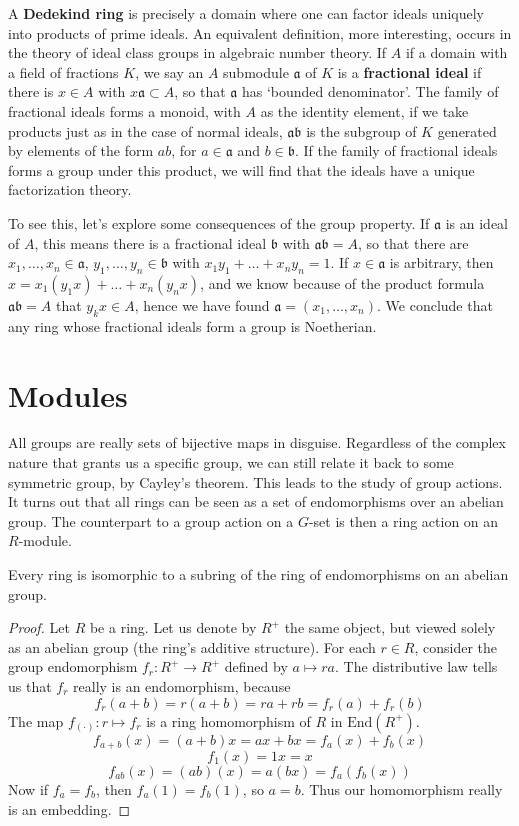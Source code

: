 A {\bf Dedekind ring} is precisely a domain where one can factor ideals uniquely into products of prime ideals. An equivalent definition, more interesting, occurs in the theory of ideal class groups in algebraic number theory. If $A$ if a domain with a field of fractions $K$, we say an $A$ submodule $\mathfrak{a}$ of $K$ is a {\bf fractional ideal} if there is $x \in A$ with $x \mathfrak{a} \subset A$, so that $\mathfrak{a}$ has `bounded denominator'. The family of fractional ideals forms a monoid, with $A$ as the identity element, if we take products just as in the case of normal ideals, $\mathfrak{ab}$ is the subgroup of $K$ generated by elements of the form $ab$, for $a \in \mathfrak{a}$ and $b \in \mathfrak{b}$. If the family of fractional ideals forms a group under this product, we will find that the ideals have a unique factorization theory.

To see this, let's explore some consequences of the group property. If $\mathfrak{a}$ is an ideal of $A$, this means there is a fractional ideal $\mathfrak{b}$ with $\mathfrak{ab} = A$, so that there are $x_1, \dots, x_n \in \mathfrak{a}$, $y_1, \dots, y_n \in \mathfrak{b}$ with $x_1y_1 + \dots + x_ny_n = 1$. If $x \in \mathfrak{a}$ is arbitrary, then $x = x_1 (y_1 x) + \dots + x_n (y_n x)$, and we know because of the product formula $\mathfrak{ab} = A$ that $y_k x \in A$, hence we have found $\mathfrak{a} = (x_1, \dots, x_n)$. We conclude that any ring whose fractional ideals form a group is Noetherian.

\chapter{Modules}

All groups are really sets of bijective maps in disguise. Regardless of the complex nature that grants us a specific group, we can still relate it back to some symmetric group, by Cayley's theorem. This leads to the study of group actions. It turns out that all rings can be seen as a set of endomorphisms over an abelian group. The counterpart to a group action on a $G$-set is then a ring action on an $R$-module.

\begin{theorem}
    Every ring is isomorphic to a subring of the ring of endomorphisms on an abelian group.
\end{theorem}
\begin{proof}
    Let $R$ be a ring. Let us denote by $R^+$ the same object, but viewed solely as an abelian group (the ring's additive structure). For each $r \in R$, consider the group endomorphism $f_r:R^+ \to R^+$ defined by $a \mapsto ra$. The distributive law tells us that $f_r$ really is an endomorphism, because
    \[ f_r(a + b) = r(a + b) = ra + rb = f_r(a) + f_r(b) \]
    The map $f_{(\cdot)}: r \mapsto f_r$ is a ring homomorphism of $R$ in $\text{End}(R^+)$.
    \[  f_{a + b}(x) = (a + b)x = ax + bx = f_a(x) + f_b(x) \]
    \[ f_{1}(x) = 1x = x \]
    \[ f_{ab}(x) = (ab)(x) = a(bx) = f_a(f_b(x)) \]
    Now if $f_a = f_b$, then $f_a(1) = f_b(1)$, so $a = b$. Thus our homomorphism really is an embedding.
\end{proof}

